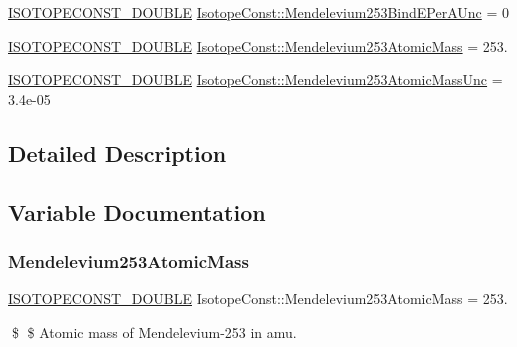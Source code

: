\begin{DoxyCompactItemize}
\mbox{\hyperlink{group___isotope_const-_macros_ga8f45a7272ce02c0b4c65c44636ed719a}{I\+S\+O\+T\+O\+P\+E\+C\+O\+N\+S\+T\+\_\+\+D\+O\+U\+B\+LE}} \mbox{\hyperlink{group___isotope_const-_mendelevium-_md253_ga82268956bc4e3f00943347348af47863}{Isotope\+Const\+::\+Mendelevium253\+Bind\+E\+Per\+A\+Unc}} = 0
\item 
\mbox{\hyperlink{group___isotope_const-_macros_ga8f45a7272ce02c0b4c65c44636ed719a}{I\+S\+O\+T\+O\+P\+E\+C\+O\+N\+S\+T\+\_\+\+D\+O\+U\+B\+LE}} \mbox{\hyperlink{group___isotope_const-_mendelevium-_md253_gaca256daf4b3725895f5ae8f582c1184c}{Isotope\+Const\+::\+Mendelevium253\+Atomic\+Mass}} = 253.
\item 
\mbox{\hyperlink{group___isotope_const-_macros_ga8f45a7272ce02c0b4c65c44636ed719a}{I\+S\+O\+T\+O\+P\+E\+C\+O\+N\+S\+T\+\_\+\+D\+O\+U\+B\+LE}} \mbox{\hyperlink{group___isotope_const-_mendelevium-_md253_ga59abc5d4ad17d55e9f8ffbf56f136eed}{Isotope\+Const\+::\+Mendelevium253\+Atomic\+Mass\+Unc}} = 3.\+4e-\/05
\end{DoxyCompactItemize}


\subsection{Detailed Description}


\subsection{Variable Documentation}
\mbox{\label{group___isotope_const-_mendelevium-_md253_gaca256daf4b3725895f5ae8f582c1184c}} 
\subsubsection{\texorpdfstring{Mendelevium253\+Atomic\+Mass}{Mendelevium253AtomicMass}}
{\footnotesize\ttfamily \mbox{\hyperlink{group___isotope_const-_macros_ga8f45a7272ce02c0b4c65c44636ed719a}{I\+S\+O\+T\+O\+P\+E\+C\+O\+N\+S\+T\+\_\+\+D\+O\+U\+B\+LE}} Isotope\+Const\+::\+Mendelevium253\+Atomic\+Mass = 253.}

\$ \$ Atomic mass of Mendelevium-\/253 in amu. \mbox{\label{group___isotope_const-_mendelevium-_md253_ga59abc5d4ad17d55e9f8ffbf56f136eed}} 
